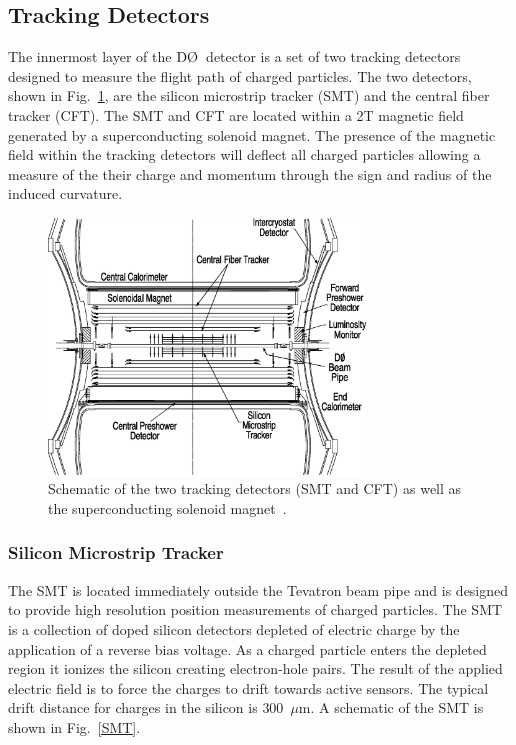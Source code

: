 \subsection{Tracking Detectors}
\label{tracking}

The innermost layer of the $\dzero$~detector is a set of two tracking detectors designed to measure the flight path of charged particles. The two detectors, shown in Fig.~\ref{InnerDetector}, are the silicon microstrip tracker (SMT) and the central fiber tracker (CFT). The SMT and CFT are located within a 2T magnetic field generated by a superconducting solenoid magnet. The presence of the magnetic field within the tracking detectors will deflect all charged particles allowing a measure of the their charge and momentum through the sign and radius of the induced curvature.

\begin{figure}[!h!tbp]
\begin{center}
\includegraphics[width=0.75\textwidth]{eps/D0/InnerDetector.eps}
\end{center}
\vspace{-0.1in}
\caption{Schematic of the two tracking detectors (SMT and CFT) as well as the superconducting solenoid magnet~\cite{Abazov:2005pn}.}
\label{InnerDetector}
\end{figure}

\subsubsection{Silicon Microstrip Tracker}

The SMT is located immediately outside the Tevatron beam pipe and is designed to provide high resolution position measurements of charged particles. The SMT is a collection of doped silicon detectors depleted of electric charge by the application of a reverse bias voltage. As a charged particle enters the depleted region it ionizes the silicon creating electron-hole pairs. The result of the applied electric field is to force the charges to drift towards active sensors. The typical drift distance for charges in the silicon is $300$~$\mu$m. A schematic of the SMT is shown in Fig.~\ref{SMT}.

